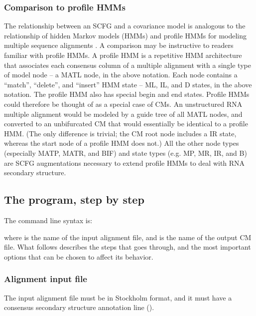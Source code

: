 \subsubsection{Comparison to profile HMMs}

The relationship between an SCFG and a covariance model is analogous
to the relationship of hidden Markov models (HMMs) and profile HMMs
for modeling multiple sequence alignments
\citep{Krogh94,Durbin98,Eddy98}. A comparison may be instructive to
readers familiar with profile HMMs.  A profile HMM is a repetitive HMM
architecture that associates each consensus column of a multiple
alignment with a single type of model node -- a MATL node, in the
above notation. Each node contains a ``match'', ``delete'', and
``insert'' HMM state -- ML, IL, and D states, in the above notation.
The profile HMM also has special begin and end states. Profile HMMs
could therefore be thought of as a special case of CMs. An
unstructured RNA multiple alignment would be modeled by a guide tree
of all MATL nodes, and converted to an unbifurcated CM that would
essentially be identical to a profile HMM. (The only difference is
trivial; the CM root node includes a IR state, whereas the start node
of a profile HMM does not.) All the other node types (especially MATP,
MATR, and BIF) and state types (e.g. MP, MR, IR, and B) are SCFG
augmentations necessary to extend profile HMMs to deal with RNA
secondary structure.


\subsection{The  program, step by step}

The  command line syntax is:


where \prog{[alifile]} is the name of the input alignment file, and
\prog{[cmfile]} is the name of the output CM file. What follows
describes the steps that  goes through, and the most
important options that can be chosen to affect its behavior.

\subsubsection{Alignment input file}

The input alignment file must be in Stockholm format, and it must have
a consensus secondary structure annotation line ().

